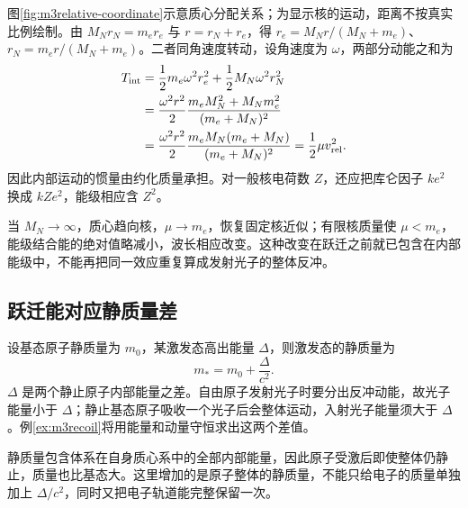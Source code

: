 图\ref{fig:m3relative-coordinate}示意质心分配关系；为显示核的运动，距离不按真实比例绘制。由 $M_Nr_N=m_er_e$ 与 $r=r_N+r_e$，得
$r_e=M_Nr/(M_N+m_e)$、$r_N=m_er/(M_N+m_e)$。二者同角速度转动，设角速度为 $\omega$，两部分动能之和为
\begin{align*}
 T_{\rm int}&=\frac12m_e\omega^2r_e^2+\frac12M_N\omega^2r_N^2\\
 &=\frac{\omega^2r^2}{2}
 \frac{m_eM_N^2+M_Nm_e^2}{(m_e+M_N)^2}\\
 &=\frac{\omega^2r^2}{2}\frac{m_eM_N(m_e+M_N)}{(m_e+M_N)^2}
 =\frac12\mu v_{\rm rel}^2.
\end{align*}
因此内部运动的惯量由约化质量承担。对一般核电荷数 $Z$，还应把库仑因子 $ke^2$ 换成 $kZe^2$，能级相应含 $Z^2$。

当 $M_N\to\infty$，质心趋向核，$\mu\to m_e$，恢复固定核近似；有限核质量使 $\mu<m_e$，能级结合能的绝对值略减小，波长相应改变。这种改变在跃迁之前就已包含在内部能级中，不能再把同一效应重复算成发射光子的整体反冲。

\subsection{跃迁能对应静质量差}

设基态原子静质量为 \(m_0\)，某激发态高出能量 \(\Delta\)，则激发态的静质量为
\[
 \boxed{m_*=m_0+\frac{\Delta}{c^2}}.
\]
\(\Delta\) 是两个静止原子内部能量之差。自由原子发射光子时要分出反冲动能，故光子能量小于 \(\Delta\)；静止基态原子吸收一个光子后会整体运动，入射光子能量须大于 \(\Delta\)。例\ref{ex:m3recoil}将用能量和动量守恒求出这两个差值。

静质量包含体系在自身质心系中的全部内部能量，因此原子受激后即使整体仍静止，质量也比基态大。这里增加的是原子整体的静质量，不能只给电子的质量单独加上 $\Delta/c^2$，同时又把电子轨道能完整保留一次。

